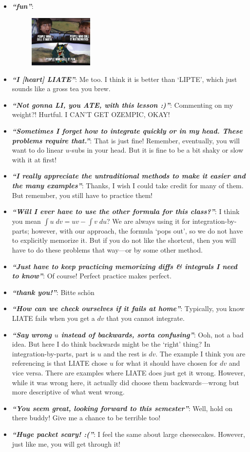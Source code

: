 \documentclass[11pt,letterpaper]{article}
\newcommand{\comment}[1]{{\itshape\bfseries ``#1''}:}
\newcommand{\pspace}{\par\vspace{\baselineskip}}
\begin{document}
\begin{itemize}
\item \comment{fun} 
	\begin{figure}[ht]
	\centering
	\includegraphics[width=0.3\textwidth]{images/fun.png}
	\end{figure}
\item \comment{I [heart] LIATE} Me too. I think it is better than `LIPTE', which just sounds like a gross tea you brew.
\item \comment{Not gonna LI, you ATE, with this lesson :)} Commenting on my weight?! Hurtful. I CAN'T GET OZEMPIC, OKAY! 
\item \comment{Sometimes I forget how to integrate quickly or in my head. These problems require that.} That is just fine! Remember, eventually, you will want to do linear $u$-subs in your head. But it is fine to be a bit shaky or slow with it at first!
\item \comment{I really appreciate the untraditional methods to make it easier and the many examples} Thanks, I wish I could take credit for many of them. But remember, you still have to practice them!
\item \comment{Will I ever have to use the other formula for this class?} I think you mean $\int u \;dv= uv - \int v \;du$? We are always using it for integration-by-parts; however, with our approach, the formula `pops out', so we do not have to explicitly memorize it. But if you do not like the shortcut, then you will have to do these problems that way---or by some other method.
\item \comment{Just have to keep practicing memorizing diffs \& integrals I need to know} Of course! Perfect practice makes perfect.
\item \comment{thank you!} Bitte sch\"on
\item \comment{How can we check ourselves if it fails at home} Typically, you know LIATE fails when you get a $dv$ that you cannot integrate. 
\item \comment{Say wrong $u$ instead of backwards, sorta confusing} Ooh, not a bad idea. But here I do think backwards might be the `right' thing? In integration-by-parts, part is $u$ and the rest is $dv$. The example I think you are referencing is that LIATE chose $u$ for what it should have chosen for $dv$ and vice versa. There are examples where LIATE does just get it wrong. However, while it was wrong here, it actually did choose them backwards---wrong but more descriptive of what went wrong. 
\item \comment{You seem great, looking forward to this semester} Well, hold on there buddy! Give me a chance to be terrible too!
\item \comment{Huge packet scary! :(} I feel the same about large cheesecakes. However, just like me, you will get through it!
\end{itemize} \pspace
\end{document}
